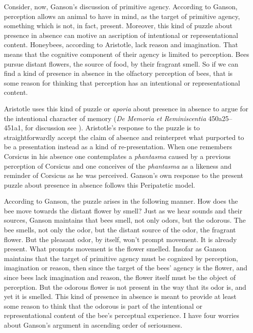 \documentclass[12pt]{article}
\begin{document}
Consider, now,  Ganson's discussion of primitive agency. According to Ganson, perception allows an animal to have in mind, as the target of primitive agency, something which is not, in fact, present. Moreover, this kind of puzzle about presence in absence can motive an ascription of intentional or representational content. Honeybees, according to Aristotle, lack reason and imagination. That means that the cognitive component of their agency is limited to perception. Bees pursue distant flowers, the source of food, by their fragrant smell. So if we can find a kind of presence in absence in the olfactory perception of bees, that is some reason for thinking that perception has an intentional or representational content. 

Aristotle uses this kind of puzzle or \emph{aporia} about presence in absence to argue for the intentional character of memory (\emph{De Memoria et Reminiscentia} 450a25–451a1, for discussion see \citealt{Sorabji:2004qa}). Aristotle's response to the puzzle is to straightforwardly accept the claim of absence and reinterpret what purported to be a presentation instead as a kind of re-presentation. When one remembers Corsicus in his absence one contemplates a \emph{phantasma} caused by a previous perception of Corsicus and one conceives of the \emph{phantasma} as a likeness and reminder of Corsicus as he was perceived. Ganson's own response to the present puzzle about presence in absence follows this Peripatetic model.

According to Ganson, the puzzle arises in the following manner. How does the bee move towards the distant flower by smell? Just as we hear sounds and their sources, Ganson maintains that bees smell, not only odors, but the odorous. The bee smells, not only the odor, but the distant source of the odor, the fragrant flower. But the pleasant odor, by itself, won't prompt movement. It is already present. What prompts movement is the flower smelled. Insofar as Ganson maintains that the target of primitive agency must be cognized by perception, imagination or reason, then since the target of the bees' agency is the flower, and since bees lack imagination and reason, the flower itself must be the object of perception. But the odorous flower is not present in the way that its odor is, and yet it is smelled. This kind of presence in absence is meant to provide at least some reason to think that the odorous is part of the intentional or representational content of the bee's perceptual experience. I have four worries about Ganson's argument in ascending order of seriousness.
\end{document}

